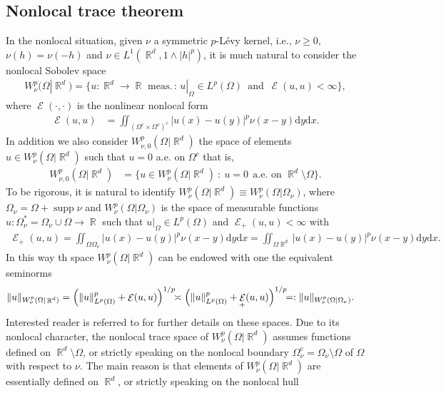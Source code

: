 \documentclass[12pt, reqno]{amsart}%
\theoremstyle{plain}  %
\theoremstyle{definition}  %
\numberwithin{equation}{section}
\DeclareMathOperator{\supp}{supp}
\DeclareMathOperator{\cE}{\mathcal{E}}
\DeclareMathOperator{\R}{\mathbb{R}}
\newcommand{\iil}{\iint}
\renewcommand{\d}{\mathrm{d}}
\newcommand{\WnuOmR}{W^{p}_{\nu}(\Omega|\R^d )}
\newcommand{\WnuOmRO}{W_{\nu,0}^{p}(\Omega|\R^d )}%
\begin{document}
\subsection{Nonlocal trace theorem} In the nonlocal situation, given $\nu$ a symmetric $p$-L{\'e}vy kernel, i.e., $\nu\geq 0$, $\nu(h)=\nu(-h)$ and  $\nu\in L^1(\R^d,1\land |h|^p)$,  it is much natural to consider the nonlocal Sobolev space
\begin{align*}
\WnuOmR=\big\lbrace u: \R^d \to \R \text{ meas.} \,: \, u|_\Omega\in L^p(\Omega)\,\!\text{ and }\,\!  \cE(u,u) <\infty \big\rbrace,
\end{align*}
where $\cE(\cdot,\cdot )$ is the nonlinear nonlocal form
\begin{align*}
\cE(u,u)&= \iil_{(\Omega^c\times\Omega^c)^c} |u(x)-u(y)|^p \nu(x-y)\d y \d x.
\end{align*}
In addition we also consider $\WnuOmRO$ the space of elements $u\in \WnuOmR$ such that $u=0$ a.e. on $\Omega^c$ that is,
\begin{align*}
\WnuOmRO
&= \{ u\in \WnuOmR~: ~u=0~~\text{a.e. on } \R^d\setminus \Omega\}.
\end{align*}
\noindent To be rigorous, it is natural  to identify $\WnuOmR\equiv W^p_\nu(\Omega|\Omega_\nu)$, where $\Omega_\nu=\Omega+\supp\nu $ and  $W^p_\nu(\Omega|\Omega_\nu)$ is the space of measurable functions $u:\Omega_\nu^*= \Omega_\nu\cup\Omega\to\R$ such that $u|_\Omega\in L^p(\Omega)$ and $\cE_+(u,u)<\infty$ with
\begin{align*}
\cE_+(u,u)	= \iil_{\Omega\Omega_\nu} |u(x)-u(y)|^p \nu(x-y)\d y \d x=\iil_{\Omega\R^d} |u(x)-u(y)|^p
\nu(x-y)\d y \d x.
\end{align*}
In this way th space $\WnuOmR$ can be endowed with one the equivalent seminorms
\begin{align*}
\|u\|_{\WnuOmR}&= \Big( \|u\|^p_{L^p(\Omega)}+ \cE(u,u)\Big)^{1/p} \hspace{-1ex}\asymp   \Big( \|u\|^p_{L^p(\Omega)}+  \cE_+(u,u)	\Big)^{1/p}
\hspace{-1ex}=: \|u\|_{W^p_\nu(\Omega|\Omega_\nu)}.
\end{align*}
\noindent Interested reader is referred  to \cite{Fog25,guy-thesis,FoKa24,Fog21b} for further details on these spaces.
Due to its nonlocal character, the nonlocal  trace space of $\WnuOmR$ assumes functions defined on $\R^d\setminus\Omega$, or strictly speaking on the nonlocal boundary $\Omega_{\nu}^e=\Omega_\nu\setminus\Omega$ of $\Omega$ with respect to $\nu$.  The main reason is that elements of $\WnuOmR$ are essentially defined on $\R^d$, or strictly speaking  on the nonlocal hull
\end{document}
